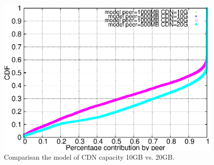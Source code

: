 \documentclass[10pt,final,journal,a4paper]{IEEEtran}
\begin{document}
\begin{figure}[!t]
\begin{center}
\includegraphics[scale=0.6]{graphs/hit-model-500MBvs-1000MB-10G-20G-cdf.eps}
\end{center}
\caption{Comparisan the model of CDN capacity 10GB vs. 20GB.}
\label{fig:10Gvs20G}
\end{figure} 
\end{document}

